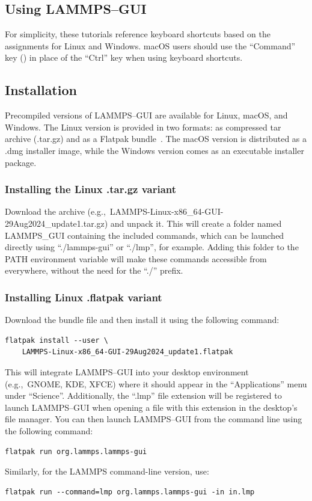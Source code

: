 \documentclass[9pt,tutorial]{livecoms}
\begin{document}
\begin{appendices}
\section{Using LAMMPS--GUI}
\label{using-lammps-gui-label}

\begin{note}
For simplicity, these tutorials reference keyboard shortcuts
based on the assignments for Linux and Windows. {macOS} users should
use the ``Command'' key (\cmd) in place of the
``Ctrl'' key when using keyboard shortcuts.
\end{note}

\subsection{Installation}

Precompiled versions of LAMMPS--GUI are available for Linux, {macOS}, and
Windows.  The Linux version is provided in two formats: as compressed tar
archive (.tar.gz) and as a Flatpak bundle~\cite{flatpak_home}.  The {macOS}
version is distributed as a .dmg installer image, while the Windows version comes
as an executable installer package.

\subsubsection{Installing the Linux .tar.gz variant}

Download the archive (e.g.,~LAMMPS-Linux-x86\_64-GUI-29Aug2024\_update1.tar.gz)
and unpack it.  This will create a folder named LAMMPS\_GUI containing the
included commands, which can be launched directly using ``./lammps-gui'' or
``./lmp'', for example.  Adding this folder to the PATH environment
variable will make these commands accessible from everywhere, without the
need for the ``./'' prefix.

\subsubsection{Installing Linux .flatpak variant}

Download the bundle file and then install it using the following command:
\begin{lstlisting}
flatpak install --user \
    LAMMPS-Linux-x86_64-GUI-29Aug2024_update1.flatpak
\end{lstlisting}
This will integrate LAMMPS--GUI into your desktop environment
(e.g.,~GNOME, KDE, XFCE) where it should appear in the ``Applications''
menu under ``Science''.  Additionally, the ``.lmp'' file extension will be
registered to launch LAMMPS--GUI when opening a file with this
extension in the desktop's file manager. You can then
launch LAMMPS--GUI from the command line using the following command:
\begin{lstlisting}
flatpak run org.lammps.lammps-gui
\end{lstlisting}
Similarly, for the LAMMPS command-line version, use:
\begin{lstlisting}
flatpak run --command=lmp org.lammps.lammps-gui -in in.lmp
\end{lstlisting}


\end{appendices}
\end{document}
